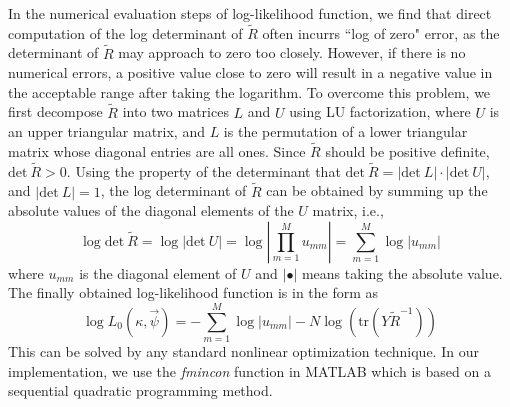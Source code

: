 \documentclass[referee]{ieice}
\begin{document}
In the numerical evaluation steps of log-likelihood function, we find that direct computation of the log determinant
of $\tilde{R}$ often incurrs ``log of zero" error, as the determinant of $\tilde{R}$ may approach to zero too closely.
However, if there is no numerical errors, a positive value close to zero will result in a negative value in
the acceptable range after taking the logarithm.
To overcome this problem, we first decompose $\tilde{R}$ into two matrices $L$ and $U$ using LU factorization,
where $U$ is an upper triangular matrix, and
$L$ is the permutation of a lower triangular matrix whose diagonal entries are all ones.
Since $\tilde{R}$ should be positive definite, $\mathrm{det}~\tilde{R}>0$.
Using the property of the determinant that $\mathrm{det}~\tilde{R}=|\mathrm{det}~L| \cdot |\mathrm{det}~U|$,
and $|\mathrm{det}~L|=1$,
the log determinant of $\tilde{R}$ can be obtained by summing up the absolute values of the diagonal elements
of the $U$ matrix, i.e.,
\begin{equation}
\log \mathrm{det}~\tilde{R}=\log |\mathrm{det}~U|=\log |\prod_{m=1}^M u_{mm}|=\sum_{m=1}^M \log |u_{mm}|
\end{equation}
where $u_{mm}$ is the diagonal element of $U$ and $|\bullet|$ means taking the absolute value.
The finally obtained log-likelihood function is in the form as
\begin{equation}
\log L_0(\kappa,\vec{\psi})=-\sum_{m=1}^M \log |u_{mm}| - N\log (\mathrm{tr}(Y\tilde{R}^{-1}))
\end{equation}
This can be solved by any standard nonlinear optimization technique. In our implementation,
we use the {\it fmincon} function in MATLAB which is based on a sequential quadratic programming method.
\end{document}
